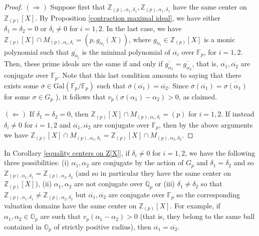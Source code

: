 \documentclass[10pt]{article}
\numberwithin{equation}{section}
\theoremstyle{definition}
\theoremstyle{definition}
\newcommand{\F}{\mathbb{F}}
\newcommand{\Q}{\mathbb{Q}}
\newcommand{\Z}{\mathbb{Z}}
\renewcommand{\O}{\mathbb{O}}
\newcommand{\Gal}{\text{Gal}}
\begin{document}
\begin{proof}
$(\Rightarrow)$ Suppose first that $\Z_{(p),\alpha_1,\delta_1},\Z_{(p),\alpha_1,\delta_1}$ have the same center on $\Z_{(p)}[X]$.
 By Proposition \ref{contraction maximal ideal}, we have either $\delta_1=\delta_2=0$ or $\delta_i\not=0$ for $i=1,2$. In the last case, we have $\Z_{(p)}[X]\cap M_{(p),\alpha_i,\delta_i}=(p,g_{\alpha_i}(X))$, where $g_{\alpha_i}\in\Z_{(p)}[X]$ is a monic polynomial such that $\overline{g_{\alpha_i}}$ is the minimal polynomial of $\overline{\alpha_i}$ over $\F_p$, for $i=1,2$.  Then, these prime ideals are the same if and only if $\overline{g_{\alpha_1}}=\overline{g_{\alpha_2}}$, that is, $\overline{\alpha_1},\overline{\alpha_2}$ are conjugate over $\F_p$. Note that this last condition amounts 
 to saying that there exists some $\overline{\sigma}\in \Gal(\overline{\F_p}/\F_p)$ such that $\overline{\sigma}(\overline{\alpha_1})=\overline{\alpha_2}$. Since $\overline{\sigma}(\overline{\alpha_1})=\overline{\sigma(\alpha_1)}$ for some $\sigma\in G_p$  \cite[Chapt. V, §2.2, Proposition 6(ii)]{Bourb}), it follows that $v_p(\sigma(\alpha_1)-\alpha_2)>0$, as claimed.

$(\Leftarrow)$ If $\delta_1=\delta_2=0$, then $\Z_{(p)}[X]\cap M_{(p),\alpha_i,\delta_i}=(p)$ for $i=1,2$. 
If instead $\delta_i\not=0$ for $i=1,2$ and $\overline{\alpha_1},\overline{\alpha_2}$ are conjugate over $\F_p$, 
then by the above arguments we have $\Z_{(p)}[X]\cap M_{(p),\alpha_1,\delta_1}=\Z_{(p)}[X]\cap M_{(p),\alpha_2,\delta_2}$.
\end{proof}

In Corollary \ref{equality centers on Z[X]}, if $\delta_i\not=0$ for $i=1,2$, we have 
the following three possibilities: (i) $\alpha_{1},\alpha_{2}$ are conjugate by the action of $G_p$ and $\delta_1=\delta_2$ 
and so $\Z_{(p),\alpha_{1},\delta_1}=\Z_{(p),\alpha_{2},\delta_2}$ (and so in particular they have the same center on $\Z_{(p)}[X]$), 
(ii) $\alpha_{1},\alpha_{2}$ are not conjugate over $\Q_p$ or (iii)
$\delta_1\not=\delta_2$ so that $\Z_{(p),\alpha_{1},\delta_1}\not=\Z_{(p),\alpha_{2},\delta_2}$ but  
$\overline{\alpha_{1}},\overline{\alpha_{2}}$ are conjugate over $\F_p$ so the corresponding valuation domains have the same center on $\Z_{(p)}[X]$. 
For example, if $\alpha_1,\alpha_2\in \O_p$ are such that $v_p(\alpha_1-\alpha_2)>0$ (that is, they belong to the same ball contained in $\O_p$ of strictly positive radius), then $\overline{\alpha_1}=\overline{\alpha_2}$.
\end{document}
